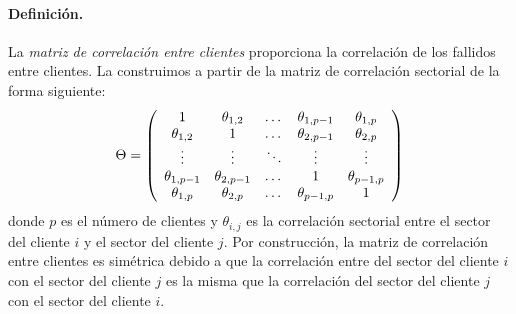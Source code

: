 \paragraph{Definici\'on.} La \emph{matriz de correlaci\'on entre clientes}
 proporciona la correlaci\'on de los
fallidos entre clientes. La construimos a partir de la matriz de correlaci\'on sectorial
de la forma siguiente:
\begin{displaymath}
\Theta = \left(
\begin{array}{ccccc}
1              & \theta_{1,2}   & \dots      & \theta_{1,p-1} & \theta_{1,p}   \cr
\theta_{1,2}   & 1              & \dots      & \theta_{2,p-1} & \theta_{2,p}   \cr
\vdots         & \vdots         & \ddots     & \vdots         & \vdots         \cr
\theta_{1,p-1} & \theta_{2,p-1} & \dots      & 1              & \theta_{p-1,p} \cr
\theta_{1,p}   & \theta_{2,p}   & \dots      & \theta_{p-1,p} & 1
\end{array}
\right)
\end{displaymath}
donde $p$ es el n\'umero de clientes y $\theta_{i,j}$ es la correlaci\'on sectorial
entre el sector del cliente $i$ y el sector del cliente $j$. Por construcci\'on, la
matriz de correlaci\'on entre clientes es sim\'etrica debido a que la correlaci\'on
entre del sector del cliente $i$ con el sector del cliente $j$ es la misma que la
correlaci\'on del sector del cliente $j$ con el sector del cliente $i$.

